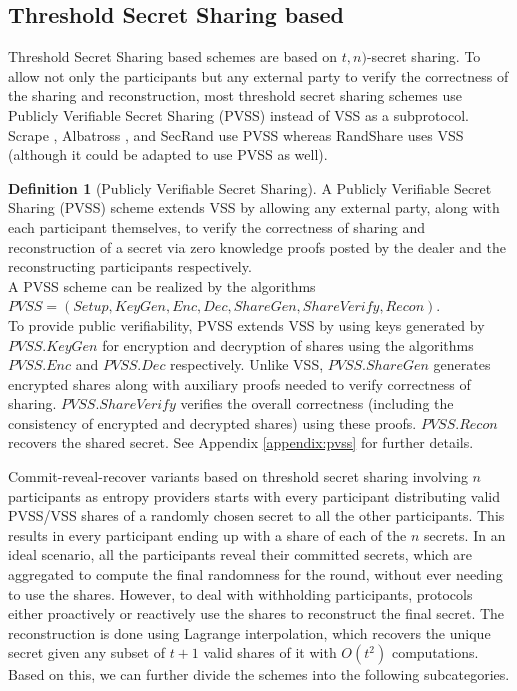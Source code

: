 \documentclass[letterpaper,twocolumn,10pt]{article}
\theoremstyle{definition}
\newtheorem{definition}[theorem]{Definition}
\theoremstyle{remark}
\begin{document}
\subsection{Threshold Secret Sharing based}
Threshold Secret Sharing based schemes are based on $t, n)$-secret sharing. To allow not only the participants but any external party to verify the correctness of the sharing and reconstruction, most threshold secret sharing schemes use Publicly Verifiable Secret Sharing (PVSS)  \cite{schoenmakers1999simple, cascudo2017scrape} instead of VSS as a subprotocol. Scrape \cite{cascudo2017scrape}, Albatross \cite{cascudo2020albatross}, and SecRand \cite{guo2020secRand} use PVSS whereas RandShare \cite{syta2017scalable} uses VSS (although it could be adapted to use PVSS as well).
\begin{definition}[Publicly Verifiable Secret Sharing]
A Publicly Verifiable Secret Sharing (PVSS) scheme extends VSS by allowing any external party, along with each participant themselves, to verify the correctness of sharing and reconstruction of a secret via zero knowledge proofs posted by the dealer and the reconstructing participants respectively.\\
A PVSS scheme can be realized by the algorithms $PVSS = (Setup, KeyGen, Enc, Dec, ShareGen, ShareVerify, Recon)$.\\
To provide public verifiability, PVSS extends VSS by using keys generated by $PVSS.KeyGen$ for encryption and decryption of shares using the algorithms $PVSS.Enc$ and $PVSS.Dec$ respectively. Unlike VSS, $PVSS.ShareGen$ generates encrypted shares along with auxiliary proofs needed to verify correctness of sharing. $PVSS.ShareVerify$ verifies the overall correctness (including the consistency of encrypted and decrypted shares) using these proofs. $PVSS.Recon$ recovers the shared secret. See Appendix \ref{appendix:pvss} for further details.
\end{definition}
Commit-reveal-recover variants based on threshold secret sharing involving $n$ participants as entropy providers starts with every participant distributing valid PVSS/VSS shares of a randomly chosen secret to all the other participants. This results in every participant ending up with a share of each of the $n$ secrets. In an ideal scenario, all the participants reveal their committed secrets, which are aggregated to compute the final randomness for the round, without ever needing to use the shares. However, to deal with withholding participants, protocols either proactively or reactively use the shares to reconstruct the final secret. The reconstruction is done using Lagrange interpolation, which recovers the unique secret given any subset of $t+1$ valid shares of it with $O(t^2)$ computations. Based on this, we can further divide the schemes into the following subcategories.
\end{document}
